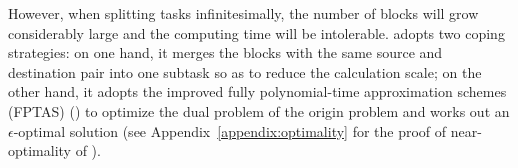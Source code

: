 However, when splitting tasks infinitesimally, the number of blocks will grow considerably large and the computing time will be intolerable. \name adopts two coping strategies: on one hand, it merges the blocks with the same source and destination pair into one subtask so as to reduce the calculation scale; on the other hand, it adopts the improved fully polynomial-time approximation schemes (FPTAS) (\cite{fleischer2000approximating}) to optimize the dual problem of the origin problem and works out an $\epsilon$-optimal solution (see Appendix~\Section\ref{appendix:optimality} for the proof of near-optimality of \name).%
